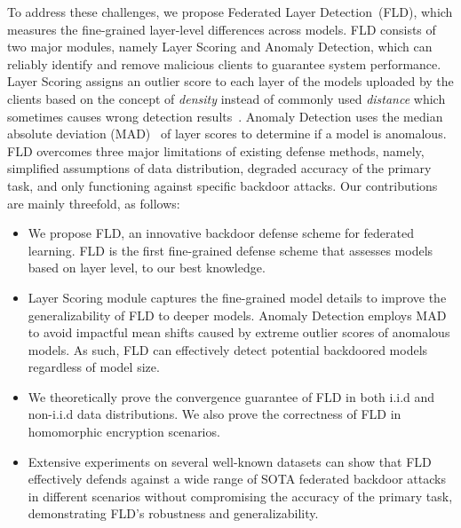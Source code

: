 To address these challenges, we propose Federated Layer Detection~(FLD), which measures the fine-grained layer-level differences across models. FLD consists of two major modules, namely Layer Scoring and Anomaly Detection, which can reliably identify and remove malicious clients to guarantee system performance.  Layer Scoring assigns an outlier score to each layer of the models uploaded by the clients based on the concept of \textit{density} instead of commonly used \textit{distance} which sometimes causes wrong detection results~\cite{cof}.  Anomaly Detection uses the median absolute deviation (MAD)~\cite{MAD} of layer scores to determine if a model is anomalous. FLD overcomes three major limitations of existing defense methods, namely, simplified assumptions of data distribution, degraded accuracy of the primary task, and only functioning against specific backdoor attacks. Our contributions are mainly threefold, as follows:
\begin{itemize}
    \item We propose FLD, an innovative backdoor defense scheme for federated learning. FLD is the first fine-grained defense scheme that assesses models based on layer level, to our best knowledge. 
    \item Layer Scoring module captures the fine-grained model details to improve the generalizability of FLD to deeper models. Anomaly Detection employs MAD to avoid impactful mean shifts caused by extreme outlier scores of anomalous models. %
    As such, FLD can effectively detect potential backdoored models regardless of model size. 
    \item We theoretically prove the convergence guarantee of FLD in both i.i.d and non-i.i.d data distributions. We also prove the correctness of FLD in homomorphic encryption scenarios.
    \item Extensive experiments on several well-known datasets can show that FLD effectively defends against a wide range of SOTA federated backdoor attacks in different scenarios without compromising the accuracy of the primary task, demonstrating FLD's robustness and generalizability.
\end{itemize}
